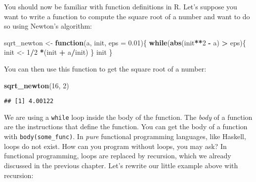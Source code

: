 \documentclass[
]{article}
\newenvironment{Shaded}{\begin{snugshade}}{\end{snugshade}}
\newcommand{\ControlFlowTok}[1]{\textcolor[rgb]{0.13,0.29,0.53}{\textbf{#1}}}
\newcommand{\DataTypeTok}[1]{\textcolor[rgb]{0.13,0.29,0.53}{#1}}
\newcommand{\DecValTok}[1]{\textcolor[rgb]{0.00,0.00,0.81}{#1}}
\newcommand{\FloatTok}[1]{\textcolor[rgb]{0.00,0.00,0.81}{#1}}
\newcommand{\KeywordTok}[1]{\textcolor[rgb]{0.13,0.29,0.53}{\textbf{#1}}}
\newcommand{\NormalTok}[1]{#1}
\newcommand{\OperatorTok}[1]{\textcolor[rgb]{0.81,0.36,0.00}{\textbf{#1}}}
\newcommand{\StringTok}[1]{\textcolor[rgb]{0.31,0.60,0.02}{#1}}
\begin{document}
You should now be familiar with function definitions in R. Let's suppose you want to write a function
to compute the square root of a number and want to do so using Newton's algorithm:

\begin{Shaded}
\begin{Highlighting}[]
\NormalTok{sqrt\_newton \textless{}{-}}\StringTok{ }\ControlFlowTok{function}\NormalTok{(a, init, }\DataTypeTok{eps =} \FloatTok{0.01}\NormalTok{)\{}
    \ControlFlowTok{while}\NormalTok{(}\KeywordTok{abs}\NormalTok{(init}\OperatorTok{**}\DecValTok{2} \OperatorTok{{-}}\StringTok{ }\NormalTok{a) }\OperatorTok{\textgreater{}}\StringTok{ }\NormalTok{eps)\{}
\NormalTok{        init \textless{}{-}}\StringTok{ }\DecValTok{1}\OperatorTok{/}\DecValTok{2} \OperatorTok{*}\NormalTok{(init }\OperatorTok{+}\StringTok{ }\NormalTok{a}\OperatorTok{/}\NormalTok{init)}
\NormalTok{    \}}
\NormalTok{    init}
\NormalTok{\}}
\end{Highlighting}
\end{Shaded}

You can then use this function to get the square root of a number:

\begin{Shaded}
\begin{Highlighting}[]
\KeywordTok{sqrt\_newton}\NormalTok{(}\DecValTok{16}\NormalTok{, }\DecValTok{2}\NormalTok{)}
\end{Highlighting}
\end{Shaded}

\begin{verbatim}
## [1] 4.00122
\end{verbatim}

We are using a \texttt{while} loop inside the body of the function. The \emph{body} of a function are the
instructions that define the function. You can get the body of a function with \texttt{body(some\_func)}.
In \emph{pure} functional programming languages, like Haskell, loops do not exist. How can you
program without loops, you may ask? In functional programming, loops are replaced by recursion,
which we already discussed in the previous chapter. Let's rewrite our little example above
with recursion:
\end{document}
